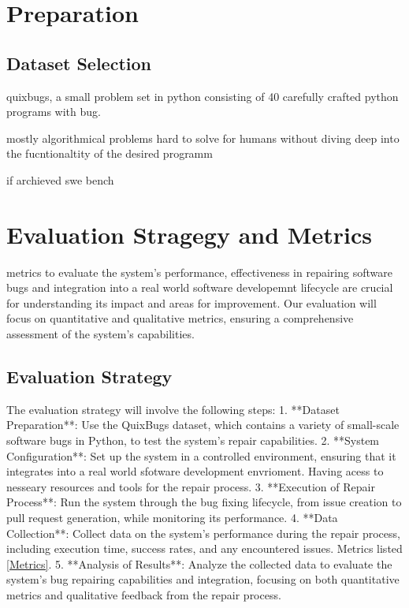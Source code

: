 \section{Preparation}
\subsection{Dataset Selection}
quixbugs, a small problem set in python \cite{linQuixBugsMultilingualProgram2017}
consisting of 40 carefully crafted python programs with bug.


mostly algorithmical problems hard to solve for humans without diving deep into the fucntionaltity of the desired programm



if archieved swe bench \cite{jimenezSWEbenchCanLanguage2024}


\section{Evaluation Stragegy and Metrics}

metrics to evaluate the system's performance, effectiveness in repairing software bugs and integration into a real world software developemnt lifecycle are crucial for understanding its impact and areas for improvement. Our evaluation will focus on quantitative and qualitative metrics, ensuring a comprehensive assessment of the system's capabilities.

\subsection{Evaluation Strategy}
The evaluation strategy will involve the following steps:
1. **Dataset Preparation**: Use the QuixBugs dataset, which contains a variety of small-scale software bugs in Python, to test the system's repair capabilities.
2. **System Configuration**: Set up the system in a controlled environment, ensuring that it integrates into a real world sfotware development envrioment. Having acess to nesseary resources and tools for the repair process.
3. **Execution of Repair Process**: Run the system through the bug fixing lifecycle, from issue creation to pull request generation, while monitoring its performance.
4. **Data Collection**: Collect data on the system's performance during the repair process, including execution time, success rates, and any encountered issues. Metrics listed \ref{Metrics}.
5. **Analysis of Results**: Analyze the collected data to evaluate the system's bug repairing capabilities and integration, focusing on both quantitative metrics and qualitative feedback from the repair process.
